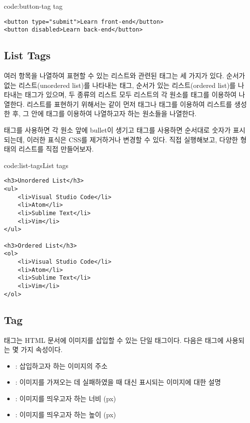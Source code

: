 \begin{codeenv}{code:button-tag}{ tag}\begin{verbatim}
<button type="submit">Learn front-end</button>
<button disabled>Learn back-end</button>
\end{verbatim}
\end{codeenv}

\subsection*{List Tags}
여러 항목을 나열하여 표현할 수 있는 리스트와 관련된 태그는 세 가지가 있다. 순서가 없는 리스트(unordered list)를 나타내는  태그, 순서가 있는 리스트(ordered list)를 나타내는  태그가 있으며, 두 종류의 리스트 모두 리스트의 각 원소를  태그를 이용하여 나열한다. 리스트를 표현하기 위해서는 \와 같이 먼저  태그나  태그를 이용하여 리스트를 생성한 후, 그 안에  태그를 이용하여 나열하고자 하는 원소들을 나열한다.

 태그를 사용하면 각 원소 앞에 bullet이 생기고  태그를 사용하면 순서대로 숫자가 표시되는데, 이러한 표식은 CSS를 제거하거나 변경할 수 있다. \를 직접 실행해보고, 다양한 형태의 리스트를 직접 만들어보자.

\begin{codeenv}{code:list-tags}{List tags}\begin{verbatim}
<h3>Unordered List</h3>
<ul>
    <li>Visual Studio Code</li>
    <li>Atom</li>
    <li>Sublime Text</li>
    <li>Vim</li>
</ul>

<h3>Ordered List</h3>
<ol>
    <li>Visual Studio Code</li>
    <li>Atom</li>
    <li>Sublime Text</li>
    <li>Vim</li>
</ol>
\end{verbatim}
\end{codeenv}

\subsection*{ Tag}
 태그는 HTML 문서에 이미지를 삽입할 수 있는 단일 태그이다. 다음은  태그에 사용되는 몇 가지 속성이다.

\begin{itemize}
    \item {}: 삽입하고자 하는 이미지의 주소
    \item {}: 이미지를 가져오는 데 실패하였을 때 대신 표시되는 이미지에 대한 설명
    \item {}: 이미지를 띄우고자 하는 너비 (px)
    \item {}: 이미지를 띄우고자 하는 높이 (px)
\end{itemize}

